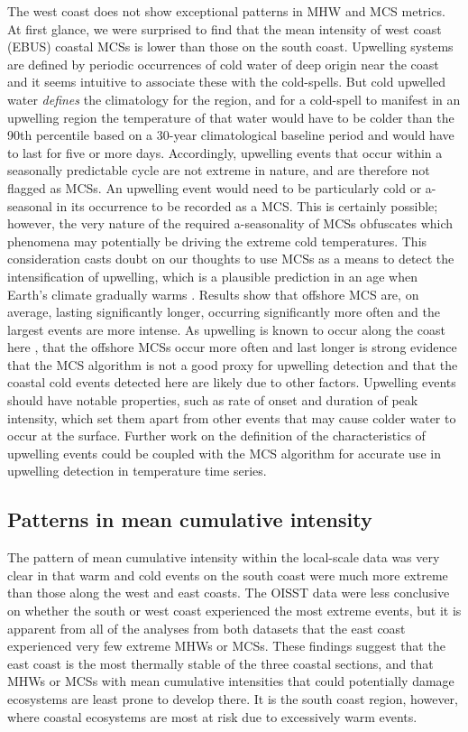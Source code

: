 \documentclass[a4paper,10pt,review]{elsarticle}
\begin{document}
The west coast does not show exceptional patterns in MHW and MCS metrics. At first glance, we were surprised to find that the mean intensity of west coast (EBUS) coastal MCSs is lower than those on the south coast. Upwelling systems are defined by periodic occurrences of cold water of deep origin near the coast \citep{Lutjeharms2000, Hutchings2009} and it seems intuitive to associate these with the cold-spells. But cold upwelled water \emph{defines} the climatology for the region, and for a cold-spell to manifest in an upwelling region the temperature of that water would have to be colder than the 90th percentile based on a 30-year climatological baseline period and would have to last for five or more days. Accordingly, upwelling events that occur within a seasonally predictable cycle are not extreme in nature, and are therefore not flagged as MCSs. An upwelling event would need to be particularly cold or a-seasonal in its occurrence to be recorded as a MCS. This is certainly possible; however, the very nature of the required a-seasonality of MCSs obfuscates which phenomena may potentially be driving the extreme cold temperatures. This consideration casts doubt on our thoughts to use MCSs as a means to detect the intensification of upwelling, which is a plausible prediction in an age when Earth's climate gradually warms \citep{Garcia-Reyes2015}. Results show that offshore MCS are, on average, lasting significantly longer, occurring significantly more often and the largest events are more intense. As upwelling is known to occur along the coast here \citep{Hutchings2009}, that the offshore MCSs occur more often and last longer is strong evidence that the MCS algorithm is not a good proxy for upwelling detection and that the coastal cold events detected here are likely due to other factors. Upwelling events should have notable properties, such as rate of onset and duration of peak intensity, which set them apart from other events that may cause colder water to occur at the surface. Further work on the definition of the characteristics of upwelling events could be coupled with the MCS algorithm for accurate use in upwelling detection in temperature time series.

\subsection{Patterns in mean cumulative intensity}
The pattern of mean cumulative intensity within the local-scale data was very clear in that warm and cold events on the south coast were much more extreme than those along the west and east coasts. The OISST data were less conclusive on whether the south or west coast experienced the most extreme events, but it is apparent from all of the analyses from both datasets that the east coast experienced very few extreme MHWs or MCSs. These findings suggest that the east coast is the most thermally stable of the three coastal sections, and that MHWs or MCSs with mean cumulative intensities that could potentially damage ecosystems are least prone to develop there. It is the south coast region, however, where coastal ecosystems are most at risk due to excessively warm events.
\end{document}
